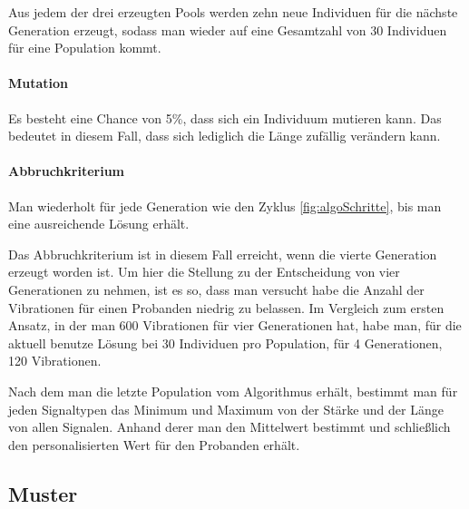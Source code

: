 Aus jedem der drei erzeugten Pools werden zehn neue Individuen f{\"u}r die n{\"a}chste Generation erzeugt, sodass man wieder auf eine Gesamtzahl von 30 Individuen f{\"u}r eine Population kommt.


\paragraph{Mutation}
Es besteht eine Chance von 5\%, dass sich ein Individuum mutieren kann. Das bedeutet in diesem Fall, dass sich lediglich die L{\"a}nge zuf{\"a}llig ver{\"a}ndern kann. 

\paragraph{Abbruchkriterium}

Man wiederholt f{\"u}r jede Generation wie den Zyklus \autoref{fig:algoSchritte}, bis man eine ausreichende L{\"o}sung erh{\"a}lt.

Das Abbruchkriterium ist in diesem Fall erreicht, wenn die vierte Generation erzeugt worden ist. Um hier die Stellung zu der Entscheidung von vier Generationen zu nehmen, ist es so, dass man versucht habe die Anzahl der Vibrationen f{\"u}r einen Probanden niedrig zu belassen. 
Im Vergleich zum ersten Ansatz, in der man 600 Vibrationen f{\"u}r vier Generationen hat, habe man, f{\"u}r die aktuell benutze L{\"o}sung bei 30 Individuen pro Population, f{\"u}r 4 Generationen, 120 Vibrationen. 

Nach dem man die letzte Population vom Algorithmus erh{\"a}lt, bestimmt man f{\"u}r jeden Signaltypen das Minimum und Maximum von der St{\"a}rke und der L{\"a}nge von allen Signalen. Anhand derer man den Mittelwert bestimmt und schlie{\ss}lich den personalisierten Wert f{\"u}r den Probanden erh{\"a}lt.

\subsection{Muster}

